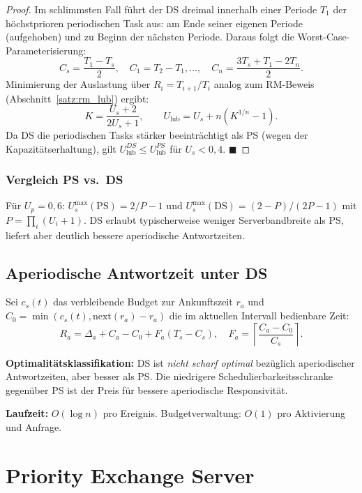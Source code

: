 ﻿\documentclass[a4paper,12pt]{report}
\theoremstyle{definition}
\begin{document}
\begin{proof}
	Im schlimmsten Fall führt der DS dreimal innerhalb einer Periode $T_1$ der
	höchstprioren periodischen Task aus: am Ende seiner eigenen Periode (aufgehoben)
	und zu Beginn der nächsten Periode. Daraus folgt die Worst-Case-Parameterisierung:
	\[
		C_s = \frac{T_1 - T_s}{2}, \quad C_1 = T_2 - T_1, \ldots, \quad
		C_n = \frac{3T_s + T_1 - 2T_n}{2}.
	\]
	Minimierung der Auslastung über $R_i = T_{i+1}/T_i$ analog zum RM-Beweis
	(Abschnitt~\ref{satz:rm_lub}) ergibt:
	\[
		K = \frac{U_s + 2}{2U_s + 1}, \qquad U_{\text{lub}} = U_s + n(K^{1/n} - 1).
	\]
	Da DS die periodischen Tasks stärker beeinträchtigt als PS (wegen der
	Kapazitätserhaltung), gilt $U_{\text{lub}}^{DS} \leq U_{\text{lub}}^{PS}$
	für $U_s < 0{,}4$. \hfill$\blacksquare$
\end{proof}

\subsubsection{Vergleich PS vs.\ DS}

Für $U_p = 0{,}6$: $U_s^{\max}(\text{PS}) = 2/P - 1$ und $U_s^{\max}(\text{DS}) = (2-P)/(2P-1)$
mit $P = \prod_{i}(U_i+1)$. DS erlaubt typischerweise weniger Serverbandbreite
als PS, liefert aber deutlich bessere aperiodische Antwortzeiten.

\subsection{Aperiodische Antwortzeit unter DS}

Sei $c_s(t)$ das verbleibende Budget zur Ankunftszeit $r_a$ und $C_0 = \min(c_s(t), \text{next}(r_a) - r_a)$ die im aktuellen Intervall bedienbare Zeit:
\[
	R_a = \Delta_a + C_a - C_0 + F_a(T_s - C_s),
	\quad F_a = \left\lceil \frac{C_a - C_0}{C_s} \right\rceil.
\]

\textbf{Optimalitätsklassifikation:} DS ist \emph{nicht scharf optimal}
bezüglich aperiodischer Antwortzeiten, aber besser als PS. Die niedrigere
Schedulierbarkeitsschranke gegenüber PS ist der Preis für bessere aperiodische
Responsivität.

\textbf{Laufzeit:} $O(\log n)$ pro Ereignis. Budgetverwaltung: $O(1)$ pro
Aktivierung und Anfrage.

\section{Priority Exchange Server}
\end{document}
